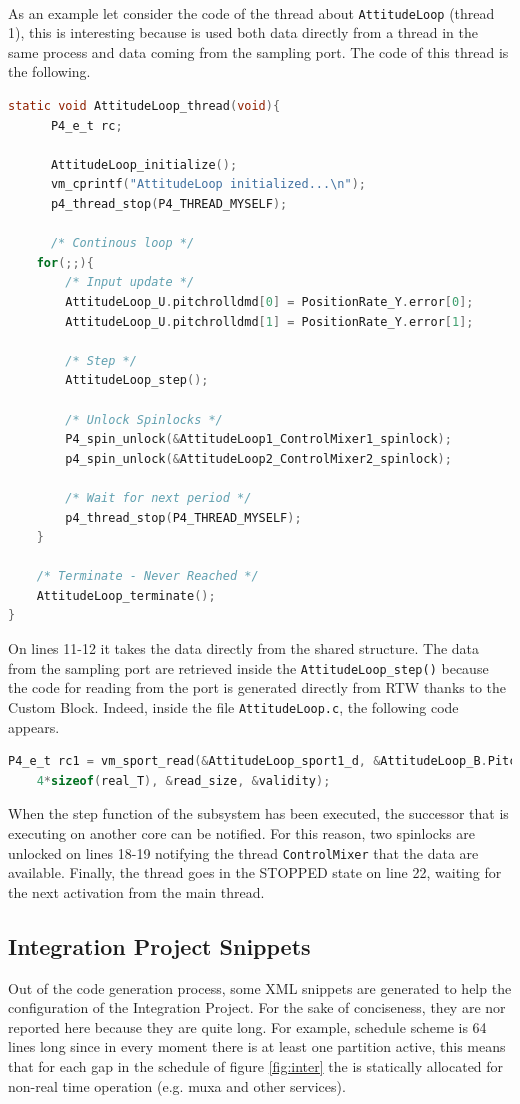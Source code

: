 \paragraph{} As an example let consider the code of the thread about \verb|AttitudeLoop| (thread 1), this is interesting because is used both data directly from a thread in the same process and data coming from the sampling port. The code of this thread is the following.
\begin{lstlisting}[language=C]
static void AttitudeLoop_thread(void){
      P4_e_t rc;

      AttitudeLoop_initialize();
      vm_cprintf("AttitudeLoop initialized...\n");
      p4_thread_stop(P4_THREAD_MYSELF);

      /* Continous loop */
	for(;;){
		/* Input update */
		AttitudeLoop_U.pitchrolldmd[0] = PositionRate_Y.error[0];
		AttitudeLoop_U.pitchrolldmd[1] = PositionRate_Y.error[1];

		/* Step */
		AttitudeLoop_step();

		/* Unlock Spinlocks */
		P4_spin_unlock(&AttitudeLoop1_ControlMixer1_spinlock);
		p4_spin_unlock(&AttitudeLoop2_ControlMixer2_spinlock);

		/* Wait for next period */
		p4_thread_stop(P4_THREAD_MYSELF);
	}

	/* Terminate - Never Reached */
	AttitudeLoop_terminate();
}
\end{lstlisting}
On lines 11-12 it takes the data directly from the shared structure. The data from the sampling port are retrieved inside the \verb|AttitudeLoop_step()| because the code for reading from the port is generated directly from RTW thanks to the Custom Block. Indeed, inside the file \verb|AttitudeLoop.c|, the following code appears.
\begin{lstlisting}[language=C]
P4_e_t rc1 = vm_sport_read(&AttitudeLoop_sport1_d, &AttitudeLoop_B.PitchRoll[0],
    4*sizeof(real_T), &read_size, &validity);
\end{lstlisting}
When the step function of the subsystem has been executed, the successor that is executing on another core can be notified. For this reason, two spinlocks are unlocked on lines 18-19 notifying the thread \verb|ControlMixer| that the data are available. Finally, the thread goes in the STOPPED state on line 22, waiting for the next activation from the main thread.

\subsection{Integration Project Snippets}
Out of the code generation process, some XML snippets are generated to help the configuration of the Integration Project. For the sake of conciseness, they are nor reported here because they are quite long. For example, schedule scheme is 64 lines long since in every moment there is at least one partition active, this means that for each gap in the schedule of figure \ref{fig:inter} the  is statically allocated for non-real time operation (e.g. muxa and other services).

